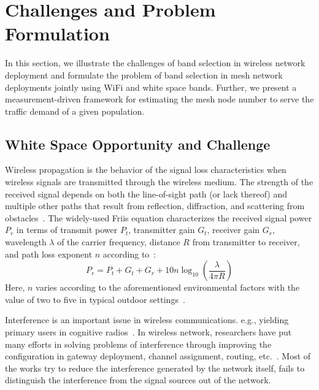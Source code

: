 \section{Challenges and Problem Formulation}
\label{sec:problemformulation}

In this section, we illustrate the challenges of band selection
in wireless network deployment and formulate the problem of band 
selection in mesh network deployments jointly using WiFi and white space bands. 
Further, we present a measurement-driven framework for estimating the 
mesh node number to serve the traffic demand of a given population.
 
\subsection{White Space Opportunity and Challenge}
\label{subsec:motivation}
Wireless propagation is the behavior of the signal loss characteristics 
when wireless signals are transmitted through the wireless medium.
The strength of the received signal depends on both the line-of-sight
path (or lack thereof) and multiple other paths that result from 
reflection, diffraction, and scattering from 
obstacles~\cite{andersen1995propagation}. The widely-used Friis
equation characterizes the received signal power $P_r$ in terms 
of transmit power $P_t$, transmitter gain $G_t$, receiver gain $G_r$, 
wavelength $\lambda$ of the carrier frequency, 
distance $R$ from transmitter to receiver, and path loss exponent 
$n$ according to~\cite{friis}:
\begin{equation}
\label{eq:friis}
P_r=P_t+G_t+G_r+10n \log_{10}\left( \frac{\lambda}{4\pi R}\right)
\end{equation}
Here, $n$ varies according to the aforementioned environmental 
factors with the value of two to five in typical outdoor 
settings~\cite{rappaport}.

Interference is an important issue in wireless communications.
e.g., yielding primary users in cognitive radios~\cite{haykin2005cognitive}.
In wireless network, researchers have put many efforts in solving problems of interference
through improving the configuration in gateway deployment, channel 
assignment, routing, etc.~\cite{he2008optimizing,tang2005interference}.
Most of the works try to reduce the interference generated by the network itself, 
fails to distinguish the interference from the signal sources out of the network.

